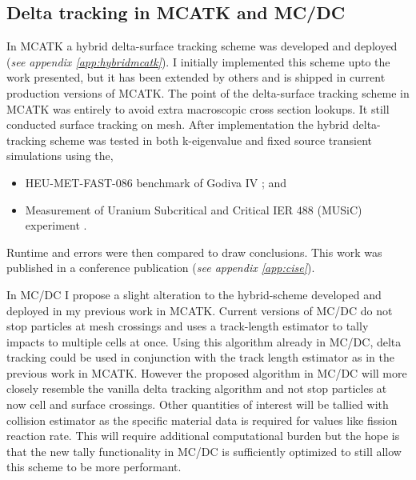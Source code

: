 \subsection{Delta tracking in MCATK and MC/DC}

In MCATK a hybrid delta-surface tracking scheme was developed and deployed (\textit{see appendix \ref{app:hybridmcatk}}).
I initially implemented this scheme upto the work presented, but it has been extended by others and is shipped in current production versions of MCATK.
The point of the delta-surface tracking scheme in MCATK was entirely to avoid extra macroscopic cross section lookups.
It still conducted surface tracking on mesh.
After implementation the hybrid delta-tracking scheme was tested in both k-eigenvalue and fixed source transient simulations using the,
\begin{itemize}
    \item HEU-MET-FAST-086 benchmark of Godiva IV \cite{godivaiv2021}; and
    \item Measurement of Uranium Subcritical and Critical IER 488 (MUSiC) experiment \cite{music2021}.
\end{itemize}
Runtime and errors were then compared to draw conclusions.
This work was published in a conference publication \cite{morgan2023oci} (\textit{see appendix \ref{app:cise}}).

In MC/DC I propose a slight alteration to the hybrid-scheme developed and deployed in my previous work in MCATK.
Current versions of MC/DC do not stop particles at mesh crossings and uses a track-length estimator to tally impacts to multiple cells at once.
Using this algorithm already in MC/DC, delta tracking could be used in conjunction with the track length estimator as in the previous work in MCATK.
However the proposed algorithm in MC/DC will more closely resemble the vanilla delta tracking algorithm and not stop particles at now cell and surface crossings.
Other quantities of interest will be tallied with collision estimator as the specific material data is required for values like fission reaction rate.
This will require additional computational burden but the hope is that the new tally functionality in MC/DC is sufficiently optimized to still allow this scheme to be more performant.

